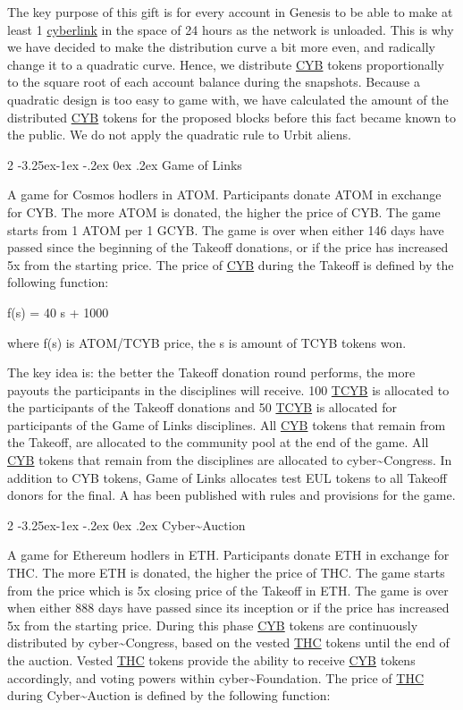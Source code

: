 \documentclass[8pt,oneside]{amsart}
\makeatletter
\newcommand{\linkred}[2]{\href{#1}{\color{red}{#2}}}
\renewcommand\subsection{\@startsection{subsection}
                                    {2}{\z@}
                                    {-3.25ex\@plus -1ex \@minus -.2ex}
                                    {0ex \@plus .2ex}
                                    {\play\Large}
                        }
\newcommand{\titleSection}[1]{\subsection{#1}}
\makeatother
\begin{document}
The key purpose of this gift is for every account in Genesis to be able to make at least 1 {\hyperref[cyberlinks]{cyberlink}} in the space of 24 hours as the network is unloaded. This is why we have decided to make the distribution curve a bit more even, and radically change it to a quadratic curve. Hence, we distribute {\hyperref[cyb]{CYB}} tokens proportionally to the square root of each account balance during the snapshots. Because a quadratic design is too easy to game with, we have calculated the amount of the distributed {\hyperref[cyb]{CYB}} tokens for the proposed blocks before this fact became known to the public. We do not apply the quadratic rule to Urbit aliens.

\titleSection{Game of Links}\label{gol}

A game for Cosmos hodlers in ATOM. Participants donate ATOM in exchange for CYB. The more ATOM is donated, the higher the price of CYB. The game starts from 1 ATOM per 1 GCYB. The game is over when either 146 days have passed since the beginning of the Takeoff donations, or if the price has increased 5x from the starting price. The price of {\hyperref[cyb]{CYB}} during the Takeoff is defined by the following function:

$$f(s) = 40 \cdot s + 1000

where f(s) is ATOM/TCYB price, the s is amount of TCYB tokens won.

The key idea is: the better the Takeoff donation round performs, the more payouts the participants in the disciplines will receive. 100 {\hyperref[cyb]{TCYB}} is allocated to the participants of the Takeoff donations and 50 {\hyperref[cyb]{TCYB}} is allocated for participants of the Game of Links disciplines. All {\hyperref[cyb]{CYB}} tokens that remain from the Takeoff, are allocated to the community pool at the end of the game. All {\hyperref[cyb]{CYB}} tokens that remain from the disciplines are allocated to cyber\~{}Congress. In addition to CYB tokens, Game of Links allocates test EUL tokens to all Takeoff donors for the final. A \linkred{https://cybercongress.ai/game-of-links/}{detailed document} has been published with rules and provisions for the game.

\titleSection{Cyber\~{}Auction}\label{cyber-auction}

A game for Ethereum hodlers in ETH. Participants donate ETH in exchange for THC. The more ETH is donated, the higher the price of THC. The game starts from the price which is 5x closing price of the Takeoff in ETH. The game is over when either 888 days have passed since its inception or if the price has increased 5x from the starting price. During this phase {\hyperref[cyb]{CYB}} tokens are continuously distributed by cyber\~{}Congress, based on the vested {\hyperref[thc]{THC}} tokens until the end of the auction. Vested {\hyperref[thc]{THC}} tokens provide the ability to receive {\hyperref[cyb]{CYB}} tokens accordingly, and voting powers within cyber\~{}Foundation. The price of {\hyperref[thc]{THC}} during Cyber\~{}Auction is defined by the following function:
\end{document}
